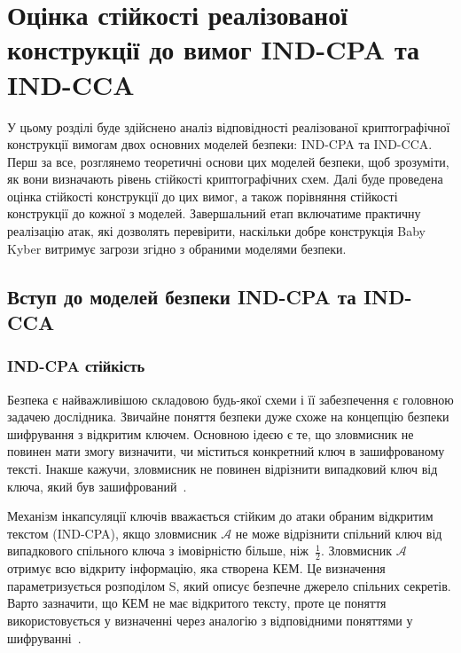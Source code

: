\chapter{Оцінка стійкості реалізованої конструкції до вимог IND-CPA та IND-CCA}
\label{chap:chapter2}  

У цьому розділі буде здійснено аналіз відповідності реалізованої криптографічної конструкції вимогам двох основних моделей безпеки: IND-CPA та IND-CCA. Перш за все, розглянемо теоретичні основи цих моделей безпеки, щоб зрозуміти, як вони визначають рівень стійкості криптографічних схем. Далі буде проведена оцінка стійкості конструкції до цих вимог, а також порівняння стійкості конструкції до кожної з моделей. Завершальний етап включатиме практичну реалізацію атак, які дозволять перевірити, наскільки добре конструкція Baby Kyber витримує загрози згідно з обраними моделями безпеки.

\section{Вступ до моделей безпеки IND-CPA та IND-CCA}

\subsection*{IND-CPA стійкість}
 Безпека є найважливішою складовою будь-якої схеми і її забезпечення є головною задачею дослідника. Звичайне поняття безпеки дуже схоже на концепцію безпеки шифрування з відкритим ключем. Основною ідеєю є те, що зловмисник не повинен мати змогу визначити, чи міститься конкретний ключ в зашифрованому тексті. Інакше кажучи, зловмисник не повинен відрізнити випадковий ключ від ключа, який був зашифрований~\cite{KEMProof}. 

 Механізм інкапсуляції ключів вважається стійким до атаки обраним відкритим текстом (IND-CPA), якщо зловмисник $\mathcal{A}$ не може відрізнити спільний ключ від випадкового спільного ключа з імовірністю більше, ніж~$\frac{1}{2}$. Зловмисник $\mathcal{A}$ отримує всю відкриту інформацію, яка створена КЕМ. Це визначення параметризується розподілом S, який описує безпечне джерело спільних секретів. Варто зазначити, що КЕМ не має відкритого тексту, проте це поняття використовується у визначенні через аналогію з відповідними поняттями у шифруванні~\cite{Campagna2020}. 

